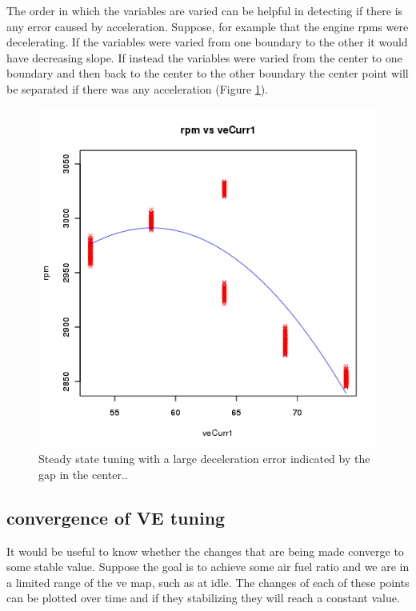 \documentclass{article}
\begin{document}
The order in which the variables are varied can be helpful in detecting
if there is any error caused by acceleration.
Suppose, for example that the engine rpms were decelerating.
If the variables were varied from one boundary to the other it would have
decreasing slope.
If instead the variables were varied from the center to one boundary and then
back to the center to the other boundary the center point will be
separated if there was any acceleration (Figure \ref{fig:ssrerr}).

\begin{figure}[tbp]
\center
\includegraphics[scale=0.5]{plotdata-veTable1-20110613-15:17:10.png}
\caption{Steady state tuning with a large deceleration error
indicated by the gap in the center..}
\label{fig:ssrerr}
\end{figure}

\subsection{convergence of VE tuning}

It would be useful to know whether the changes that are being made
converge to some stable value.
Suppose the goal is to achieve some air fuel ratio and we are in a
limited range of the ve map, such as at idle.
The changes of each of these points can be plotted over time and
if they stabilizing they will reach a constant value.
\end{document}
